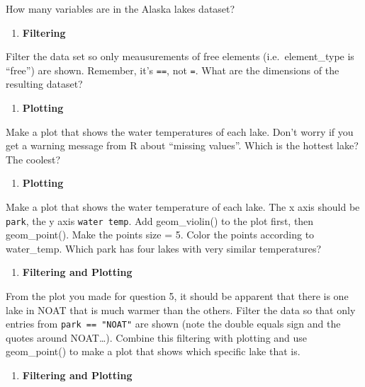 \documentclass[
]{krantz}
\providecommand{\tightlist}{%
  \setlength{\itemsep}{0pt}\setlength{\parskip}{0pt}}
\begin{document}
How many variables are in the Alaska lakes dataset?

\begin{enumerate}
\def\labelenumi{\arabic{enumi}.}
\setcounter{enumi}{2}
\tightlist
\item
  \textbf{Filtering}
\end{enumerate}

Filter the data set so only meausurements of free elements (i.e.~element\_type is ``free'') are shown. Remember, it's \texttt{==}, not \texttt{=}. What are the dimensions of the resulting dataset?

\begin{enumerate}
\def\labelenumi{\arabic{enumi}.}
\setcounter{enumi}{3}
\tightlist
\item
  \textbf{Plotting}
\end{enumerate}

Make a plot that shows the water temperatures of each lake. Don't worry if you get a warning message from R about ``missing values''. Which is the hottest lake? The coolest?

\begin{enumerate}
\def\labelenumi{\arabic{enumi}.}
\setcounter{enumi}{4}
\tightlist
\item
  \textbf{Plotting}
\end{enumerate}

Make a plot that shows the water temperature of each lake. The x axis should be \texttt{park}, the y axis \texttt{water\ temp}. Add geom\_violin() to the plot first, then geom\_point(). Make the points size = 5. Color the points according to water\_temp. Which park has four lakes with very similar temperatures?

\begin{enumerate}
\def\labelenumi{\arabic{enumi}.}
\setcounter{enumi}{5}
\tightlist
\item
  \textbf{Filtering and Plotting}
\end{enumerate}

From the plot you made for question 5, it should be apparent that there is one lake in NOAT that is much warmer than the others. Filter the data so that only entries from \texttt{park\ ==\ "NOAT"} are shown (note the double equals sign and the quotes around NOAT\ldots). Combine this filtering with plotting and use geom\_point() to make a plot that shows which specific lake that is.

\begin{enumerate}
\def\labelenumi{\arabic{enumi}.}
\setcounter{enumi}{6}
\tightlist
\item
  \textbf{Filtering and Plotting}
\end{enumerate}
\end{document}
